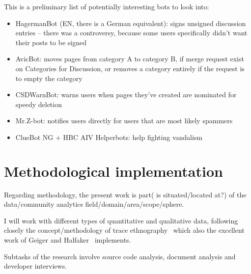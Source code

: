 \documentclass[pdftex,a4paper,11pt]{scrartcl}
\begin{document}
This is a preliminary list of potentially interesting bots to look into:

\begin{itemize}
  \item HagermanBot (EN, there is a German equivalent): signs unsigned discussion entries -- there was a
  controversy, because some users specifically didn't want their posts to be
  signed
  \item AvicBot: moves pages from category A to category B, if merge request exist on Categories for Discussion, or removes a category entirely if the request is to empty the category
  \item CSDWarnBot: warns users when pages they've created are nominated for speedy deletion
  \item Mr.Z-bot: notifies users directly for users that are most likely spammers
  \item ClueBot NG + HBC AIV Helperbots: help fighting vandalism
\end{itemize}

\section{Methodological implementation}
Regarding methodology, the present work is part( is situated/located at?) of the data/community analytics field/domain/area/scope/sphere.

I will work with different types of quantitative and qualitative data, following closely the concept/methodology of trace ethnography~\cite{GeiRib2011} which also the excellent work of Geiger and Halfaker~\cite{GeiHal2017} implements.

Subtasks of the research involve source code analysis, document analysis and developer interviews.

\begin{comment}
* methods:
  * begin with some data dumps, but ask additional questions and supplement with different data and methods
  * cooking data with care: take note of data science pipeline: explore the data, compile it carefully, ask critical questions
  * interviews with bot developers: understanding their considerations when developing the bot code.
\end{comment}
\end{document}
